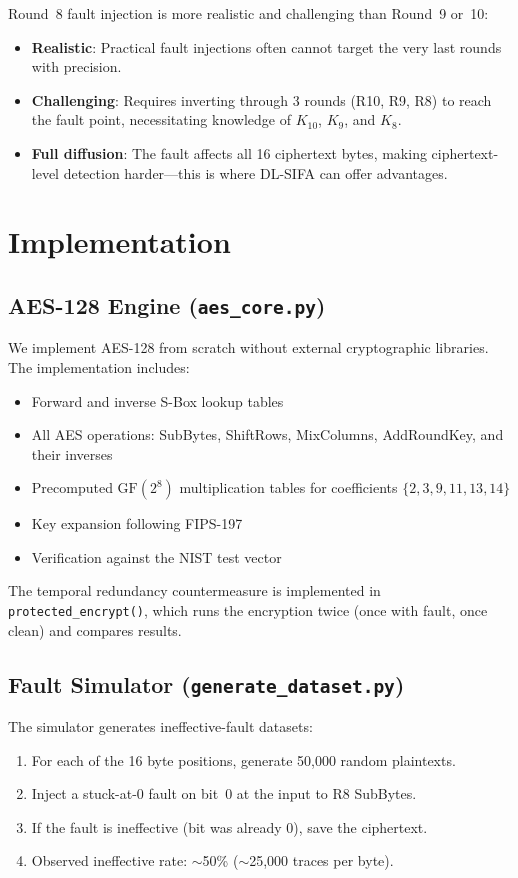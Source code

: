 \documentclass[11pt,a4paper]{article}
\begin{document}
Round~8 fault injection is more realistic and challenging than Round~9 or~10:
\begin{itemize}
    \item \textbf{Realistic}: Practical fault injections often cannot target the very last rounds with precision.
    \item \textbf{Challenging}: Requires inverting through 3 rounds (R10, R9, R8) to reach the fault point, necessitating knowledge of $K_{10}$, $K_9$, and $K_8$.
    \item \textbf{Full diffusion}: The fault affects all 16 ciphertext bytes, making ciphertext-level detection harder---this is where DL-SIFA can offer advantages.
\end{itemize}

\section{Implementation}

\subsection{AES-128 Engine (\texttt{aes\_core.py})}

We implement AES-128 from scratch without external cryptographic libraries. The implementation includes:
\begin{itemize}
    \item Forward and inverse S-Box lookup tables
    \item All AES operations: SubBytes, ShiftRows, MixColumns, AddRoundKey, and their inverses
    \item Precomputed $\text{GF}(2^8)$ multiplication tables for coefficients $\{2,3,9,11,13,14\}$
    \item Key expansion following FIPS-197
    \item Verification against the NIST test vector
\end{itemize}

The temporal redundancy countermeasure is implemented in \texttt{protected\_encrypt()}, which runs the encryption twice (once with fault, once clean) and compares results.

\subsection{Fault Simulator (\texttt{generate\_dataset.py})}

The simulator generates ineffective-fault datasets:
\begin{enumerate}
    \item For each of the 16 byte positions, generate 50,000 random plaintexts.
    \item Inject a stuck-at-0 fault on bit~0 at the input to R8 SubBytes.
    \item If the fault is ineffective (bit was already 0), save the ciphertext.
    \item Observed ineffective rate: $\sim$50\% ($\sim$25,000 traces per byte).
\end{enumerate}
\end{document}
